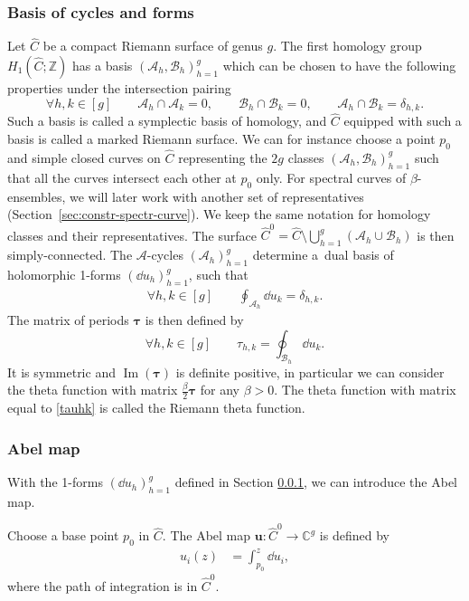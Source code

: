 \documentclass[10pt,a4paper]{amsart}
\numberwithin{equation}{section}
\newcommand{\C}{\mathbb{C}}
\newcommand{\A}{\mathcal{A}}
\newcommand{\B}{\mathcal{B}}
\begin{document}
\subsubsection{Basis of cycles and forms}
\label{sec:base-cycles-forms}
Let $\widehat{C}$ be a compact Riemann surface of genus $g$. The first
homology group $H_{1}(\widehat{C}; \mathbb{Z})$ has a basis $(\A_{h}, \B_{h})_{h = 1}^{g}$ which can be chosen to have the following properties under the intersection pairing
\begin{equation*}
 \forall h,k \in [g]\qquad \A_{h}\cap\A_{k} = 0,\qquad \B_{h}\cap\B_{k} = 0,\qquad \A_{h}\cap \B_{k} = \delta_{h,k}.
\end{equation*}
Such a basis is called a symplectic basis of homology, and $\widehat{C}$ equipped with such a basis is called a marked Riemann surface. We can for instance choose a point $p_{0}$ and simple closed curves on $\widehat{C}$ representing the $2g$ classes $(\A_{h}, \B_{h})_{h = 1}^g$
such that all the curves intersect each other at $p_{0}$ only. For spectral curves of $\beta$-ensembles, we will later work with another set of representatives (Section~\ref{sec:constr-spectr-curve}). We keep the same notation for homology classes and their representatives. The
surface $\widehat{C}^{0} = \widehat{C} \setminus \bigcup_{h=1}^{g}(\A_{h}\cup\B_{h})$ is
then simply-connected. The $\A$-cycles $(\A_h)_{h = 1}^{g}$ determine a~dual basis of holomorphic 1-forms
$(\dd u_{h})_{h = 1}^{g}$, such that
\begin{equation*}
 \begin{split}
\forall h,k \in [g]\qquad \oint_{\A_{h}}\dd u_{k} = \delta_{h,k}.
 \end{split}
\end{equation*}
The matrix of periods $\bm{\tau}$ is then defined by
\begin{equation}
\label{tauhk} \forall h,k \in [g] \qquad \tau_{h,k} = \oint_{\B_{h}}\dd u_{k}.
\end{equation}
It is symmetric and $\operatorname{Im}(\bm{\tau})$ is definite positive, in particular we can consider the theta function with matrix $\frac{\beta}{2} \bm{\tau}$ for any $\beta > 0$. The theta function with matrix equal to \eqref{tauhk} is called the Riemann theta function.



\subsubsection{Abel map}
\label{SecAbel} With the 1-forms $(\dd u_{h})_{h = 1}^{g}$ defined in Section
\ref{sec:base-cycles-forms}, we can introduce the Abel map.
\begin{Definition}
 Choose a base point $p_{0}$ in $\widehat{C}$. The Abel map
 $\bm{u} \colon \widehat{C}^{0} \to \C^{g}$ is defined by
 \begin{equation*}
 \begin{split}
 u_{i}(z) &= \int_{p_{0}}^{z}\dd u_{i},
 \end{split}
 \end{equation*}
 where the path of integration is in $\widehat{C}^0$.
 \end{Definition}
\end{document}
